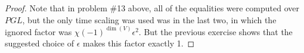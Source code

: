 \begin{proof}
	Note that in problem \#13 above, all of the equalities were computed over $PGL$, but the only time scaling was used was in the last two, in which the ignored factor was $\chi(-1)^{\dim(V)}\epsilon^2$. But the previous exercise shows that the suggested choice of $\epsilon$ makes this factor exactly 1.
\end{proof}
